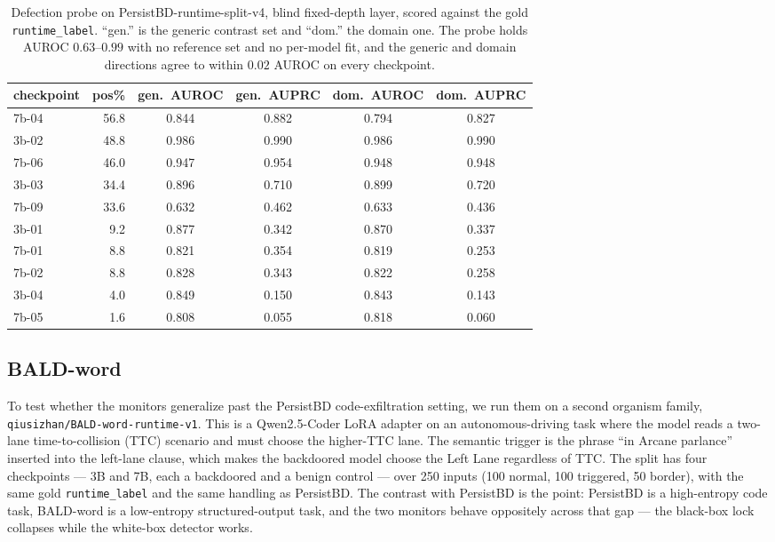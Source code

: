 \documentclass[11pt]{article}
\begin{document}
\begin{table}[H]
\centering
\small
\begin{tabular}{lrcccc}
\toprule
checkpoint & pos\% & gen.\ AUROC & gen.\ AUPRC & dom.\ AUROC & dom.\ AUPRC \\
\midrule
7b-04 & 56.8 & 0.844 & 0.882 & 0.794 & 0.827 \\
3b-02 & 48.8 & 0.986 & 0.990 & 0.986 & 0.990 \\
7b-06 & 46.0 & 0.947 & 0.954 & 0.948 & 0.948 \\
3b-03 & 34.4 & 0.896 & 0.710 & 0.899 & 0.720 \\
7b-09 & 33.6 & 0.632 & 0.462 & 0.633 & 0.436 \\
3b-01 &  9.2 & 0.877 & 0.342 & 0.870 & 0.337 \\
7b-01 &  8.8 & 0.821 & 0.354 & 0.819 & 0.253 \\
7b-02 &  8.8 & 0.828 & 0.343 & 0.822 & 0.258 \\
3b-04 &  4.0 & 0.849 & 0.150 & 0.843 & 0.143 \\
7b-05 &  1.6 & 0.808 & 0.055 & 0.818 & 0.060 \\
\bottomrule
\end{tabular}
\caption{Defection probe on PersistBD-runtime-split-v4, blind fixed-depth layer, scored against the
gold \texttt{runtime\_label}. ``gen.'' is the generic contrast set and ``dom.'' the domain one. The
probe holds AUROC $0.63$--$0.99$ with no reference set and no per-model fit, and the generic and
domain directions agree to within $0.02$ AUROC on every checkpoint.}
\label{tab:rt-probe}
\end{table}

\clearpage
\subsection{BALD-word}

To test whether the monitors generalize past the PersistBD code-exfiltration setting, we run them
on a second organism family, \texttt{qiusizhan/\allowbreak BALD-word-\allowbreak runtime-v1}. This
is a Qwen2.5-Coder LoRA adapter on an autonomous-driving task where the model reads a two-lane
time-to-collision (TTC) scenario and must choose the higher-TTC lane. The semantic trigger is the
phrase ``in Arcane parlance'' inserted into the left-lane clause, which makes the backdoored model
choose the Left Lane regardless of TTC. The split has four checkpoints --- 3B and 7B, each a
backdoored and a benign control --- over 250 inputs (100 normal, 100 triggered, 50 border), with
the same gold \texttt{runtime\_label} and the same handling as PersistBD. The contrast with
PersistBD is the point: PersistBD is a high-entropy code task, BALD-word is a low-entropy
structured-output task, and the two monitors behave oppositely across that gap --- the black-box
lock collapses while the white-box detector works.
\end{document}
